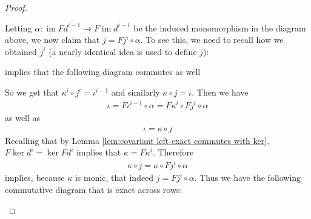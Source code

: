 \documentclass{article}
\DeclareMathOperator{\im}{\mathrm{im}}
\DeclareMathOperator{\cok}{\mathrm{cok}}
\begin{document}
\begin{proof}
\begin{enumerate}[(a)]
\begin{center}
    \end{center}
    Letting $\alpha:\im Fd^{i-1}\to F\im d^{i-1}$ be the induced monomorphism in the diagram above, we now claim that $j=Fj^i\circ \alpha$. To see this, we need to recall how we obtained $j^i$ (a nearly identical idea is used to define $j$):
    \begin{center}
    \end{center}
    implies that the following diagram commutes as well
    \begin{center}
    \end{center}
    So we get that $\kappa^i\circ j^i=\iota^{i-1}$ and similarly $\kappa \circ j=\iota$. Then we have
    \begin{align*}
        \iota=F\iota^{i-1}\circ \alpha =F\kappa^i\circ Fj^i \circ \alpha
    \end{align*}
    as well as
    \begin{align*}
        \iota=\kappa \circ j
    \end{align*}
    Recalling that by Lemma \ref{lem:covariant left exact commutes with ker}, $F\ker d^i=\ker Fd^i$ implies that $\kappa=F\kappa^i$. Therefore
    \begin{align*}
        \kappa \circ j=\kappa \circ Fj^i \circ \alpha
    \end{align*}
    implies, because $\kappa$ is monic, that indeed $j=Fj^i\circ \alpha$. Thus we have the following commutative diagram that is exact across rows:
    \begin{center}
\end{center}
\end{enumerate}
\end{proof}
\end{document}
